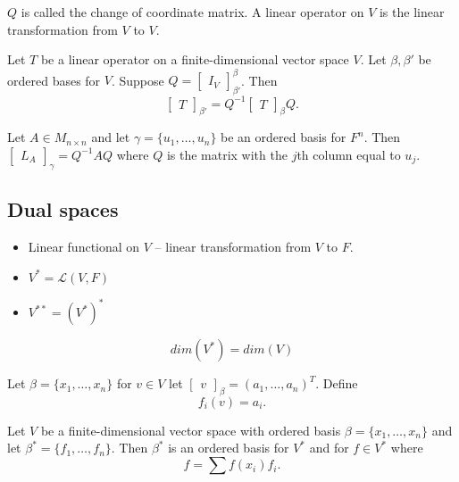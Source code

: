 \documentclass[12pt]{article}
\newenvironment{theorem}[2][Theorem]{\begin{trivlist}
\item[\hskip \labelsep {\bfseries #1}\hskip \labelsep {\bfseries #2.}]}{\end{trivlist}}
\newenvironment{corollary}[2][Corollary]{\begin{trivlist}
\item[\hskip \labelsep {\bfseries #1}\hskip \labelsep {\bfseries #2}]}{\end{trivlist}}
\begin{document}
\noindent $Q$ is called the change of coordinate matrix. A linear operator on $V$ is the linear transformation from $V$ to $V$.

\begin{theorem}{2.23}
Let $T$ be a linear operator on a finite-dimensional vector space $V$. Let $\beta, \beta'$ be ordered bases for $V$. Suppose $Q = \begin{bmatrix} I_V \end{bmatrix}_{\beta'}^\beta$. Then $$\begin{bmatrix} T \end{bmatrix}_{\beta'} = Q^{-1}\begin{bmatrix} T \end{bmatrix}_\beta Q.$$
\end{theorem}

\begin{corollary}{26}
Let $A \in M_{n \times n}$ and let $\gamma = \{u_1, \dots, u_n\}$ be an ordered basis for $F^n$. Then $\begin{bmatrix} L_A \end{bmatrix}_\gamma = Q^{-1}AQ$ where $Q$ is the matrix with the $j$th column equal to $u_j$. 
\end{corollary}

\subsection{Dual spaces}

\begin{itemize}
    \item Linear functional on $V$  --  linear transformation from $V$ to $F$.
    
    \item $V^* = \mathcal{L}(V,F)$
    
    \item $V^{**} = (V^*)^*$
\end{itemize}

$$dim(V^*) = dim(V)$$

\noindent Let $\beta = \{x_1, \dots, x_n\}$ for $v \in V$ let $\begin{bmatrix} v \end{bmatrix}_\beta = (a_1, \dots, a_n)^T$. Define $$f_i(v) = a_i.$$

\begin{theorem}{2.24}
Let $V$ be a finite-dimensional vector space with ordered basis $\beta = \{x_1, \dots, x_n\}$ and let $\beta^* = \{f_1, \dots, f_n\}$. Then $\beta^*$ is an ordered basis for $V^*$ and for $f \in V^*$ where $$f = \sum f(x_i)f_i.$$
\end{theorem}
\end{document}
